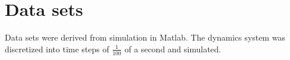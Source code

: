\section{Data sets} \label{sec:data}


Data sets were derived from simulation in Matlab. The dynamics system was
discretized into time steps of $\frac{1}{100}$ of a second and simulated. 
